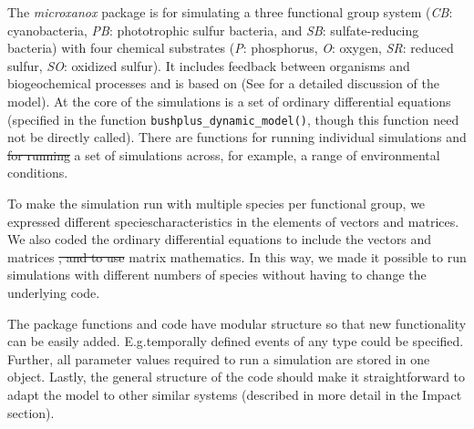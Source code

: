 \documentclass[]{elsarticle} %
\providecommand{\DIFaddtex}[1]{{\protect\color{blue}\uwave{#1}}} %
\providecommand{\DIFdeltex}[1]{{\protect\color{red}\sout{#1}}}                      %
\providecommand{\DIFaddbegin}{} %
\providecommand{\DIFaddend}{} %
\providecommand{\DIFdelbegin}{} %
\providecommand{\DIFdelend}{} %
\providecommand{\DIFadd}[1]{\texorpdfstring{\DIFaddtex{#1}}{#1}} %
\providecommand{\DIFdel}[1]{\texorpdfstring{\DIFdeltex{#1}}{}} %
\newcommand{\DIFscaledelfig}{0.5}
\newlength{\DIFdelgraphicswidth} %
\newlength{\DIFdelgraphicsheight} %
\newcommand{\DIFaddincludegraphics}[2][]{{\color{blue}\fbox{\DIFOincludegraphics[#1]{#2}}}} %
\newcommand{\DIFdelincludegraphics}[2][]{%
\sbox{\DIFdelgraphicsbox}{\DIFOincludegraphics[#1]{#2}}%
\settoboxwidth{\DIFdelgraphicswidth}{\DIFdelgraphicsbox} %
\settoboxtotalheight{\DIFdelgraphicsheight}{\DIFdelgraphicsbox} %
\scalebox{\DIFscaledelfig}{%
\parbox[b]{\DIFdelgraphicswidth}{\usebox{\DIFdelgraphicsbox}\\[-\baselineskip] \rule{\DIFdelgraphicswidth}{0em}}\llap{\resizebox{\DIFdelgraphicswidth}{\DIFdelgraphicsheight}{%
\setlength{\unitlength}{\DIFdelgraphicswidth}%
\begin{picture}(1,1)%
\thicklines\linethickness{2pt} %
{\color[rgb]{1,0,0}\put(0,0){\framebox(1,1){}}}%
{\color[rgb]{1,0,0}\put(0,0){\line( 1,1){1}}}%
{\color[rgb]{1,0,0}\put(0,1){\line(1,-1){1}}}%
\end{picture}%
}\hspace*{3pt}}} %
} %
\DeclareRobustCommand{\DIFaddbegin}{\DIFOaddbegin \let\includegraphics\DIFaddincludegraphics} %
\DeclareRobustCommand{\DIFaddend}{\DIFOaddend \let\includegraphics\DIFOincludegraphics} %
\DeclareRobustCommand{\DIFdelbegin}{\DIFOdelbegin \let\includegraphics\DIFdelincludegraphics} %
\DeclareRobustCommand{\DIFdelend}{\DIFOaddend \let\includegraphics\DIFOincludegraphics} %
\begin{document}
The \emph{microxanox} package is for simulating a three functional group system (\emph{CB}: cyanobacteria, \emph{PB}: phototrophic sulfur bacteria, and \emph{SB}: sulfate-reducing bacteria) with four chemical substrates (\emph{P}: phosphorus, \emph{O}: oxygen, \emph{SR}: reduced sulfur, \emph{SO}: oxidized sulfur). It includes feedback between organisms and biogeochemical processes and is based on \citet{Bush2017} (See \citet{Bush2017} for a detailed discussion of the model). At the core of the simulations is a set of ordinary differential equations (specified in the function \texttt{bushplus\_dynamic\_model()}, though this function need not be directly called). There are functions for running individual simulations and \DIFdelbegin \DIFdel{for running }\DIFdelend a set of simulations across, for example, a range of environmental conditions.

To make the simulation run with multiple species per functional group, we expressed different species\DIFaddbegin \DIFadd{' }\DIFaddend characteristics in the elements of vectors and matrices. We also coded the ordinary differential equations to include the vectors and matrices \DIFdelbegin \DIFdel{, and to use }\DIFdelend \DIFaddbegin \DIFadd{and used }\DIFaddend matrix mathematics. In this way, we made it possible to run simulations with different numbers of species without having to change the underlying code.

The package functions and code have \DIFaddbegin \DIFadd{a }\DIFaddend modular structure so that new functionality can be easily added. E.g.\DIFaddbegin \DIFadd{, }\DIFaddend temporally defined events of any type could be specified. Further, all parameter values required to run a simulation are stored in one object. Lastly, the general structure of the code should make it straightforward to adapt the model to other similar systems (described in more detail in the Impact section).

\DIFdelbegin %
\DIFdelend \DIFaddbegin \subsection{\DIFadd{Software architecture}}\label{software-architecture}
\DIFaddend 
\end{document}
